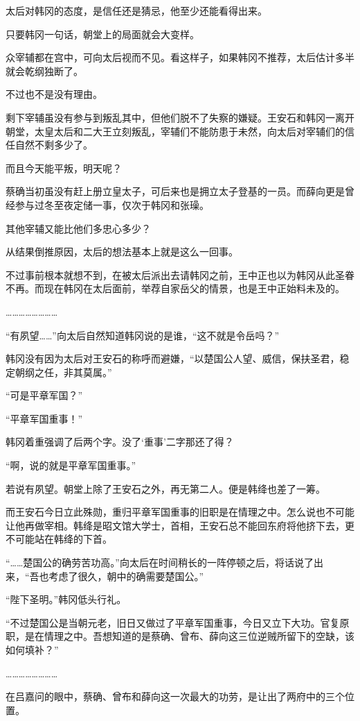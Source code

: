 太后对韩冈的态度，是信任还是猜忌，他至少还能看得出来。

只要韩冈一句话，朝堂上的局面就会大变样。

众宰辅都在宫中，可向太后视而不见。看这样子，如果韩冈不推荐，太后估计多半就会乾纲独断了。

不过也不是没有理由。

剩下宰辅虽没有参与到叛乱其中，但他们脱不了失察的嫌疑。王安石和韩冈一离开朝堂，太皇太后和二大王立刻叛乱，宰辅们不能防患于未然，向太后对宰辅们的信任自然不剩多少了。

而且今天能平叛，明天呢？

蔡确当初虽没有赶上册立皇太子，可后来也是拥立太子登基的一员。而薛向更是曾经参与过冬至夜定储一事，仅次于韩冈和张璪。

其他宰辅又能比他们多忠心多少？

从结果倒推原因，太后的想法基本上就是这么一回事。

不过事前根本就想不到，在被太后派出去请韩冈之前，王中正也以为韩冈从此圣眷不再。而现在韩冈在太后面前，举荐自家岳父的情景，也是王中正始料未及的。

……………………

“有夙望……”向太后自然知道韩冈说的是谁，“这不就是令岳吗？”

韩冈没有因为太后对王安石的称呼而避嫌，“以楚国公人望、威信，保扶圣君，稳定朝纲之任，非其莫属。”

“可是平章军国？”

“平章军国重事！”

韩冈着重强调了后两个字。没了‘重事’二字那还了得？

“啊，说的就是平章军国重事。”

若说有夙望。朝堂上除了王安石之外，再无第二人。便是韩绛也差了一筹。

而王安石今日立此殊勋，重归平章军国重事的旧职是在情理之中。怎么说也不可能让他再做宰相。韩绛是昭文馆大学士，首相，王安石总不能回东府将他挤下去，更不可能站在韩绛的下首。

“……楚国公的确劳苦功高。”向太后在时间稍长的一阵停顿之后，将话说了出来，“吾也考虑了很久，朝中的确需要楚国公。”

“陛下圣明。”韩冈低头行礼。

“不过楚国公是当朝元老，旧日又做过了平章军国重事，今日又立下大功。官复原职，是在情理之中。吾想知道的是蔡确、曾布、薛向这三位逆贼所留下的空缺，该如何填补？”

……………………

在吕嘉问的眼中，蔡确、曾布和薛向这一次最大的功劳，是让出了两府中的三个位置。

